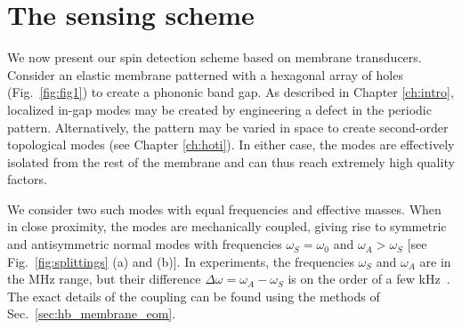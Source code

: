 
\section{The sensing scheme} \label{sec:spins_scheme}
We now present our spin detection scheme based on membrane transducers. Consider an elastic membrane patterned with a hexagonal array of holes (Fig.~\ref{fig:fig1}) to create a phononic band gap. As described in Chapter \ref{ch:intro}, localized in-gap modes may be created by engineering a defect in the periodic pattern. Alternatively, the pattern may be varied in space to create second-order topological modes (see Chapter \ref{ch:hoti}). In either case, the modes are effectively isolated from the rest of the membrane and can thus reach extremely high quality factors.

We consider two such modes with equal frequencies and effective masses. When in close proximity, the modes are mechanically coupled, giving rise to symmetric and antisymmetric normal modes with frequencies $\omega_S = \omega_0$ and $\omega_A > \omega_S$ [see Fig.~\ref{fig:splittings} (a) and (b)]. In experiments, the frequencies $\omega_S$ and $\omega_A$ are in the MHz range, but their difference $\Delta \omega = \omega_A - \omega_S$ is on the order of a few kHz~\cite{Haelg_2021, Catalini_2020}. The exact details of the coupling can be found using the methods of Sec.~\ref{sec:hb_membrane_eom}.

